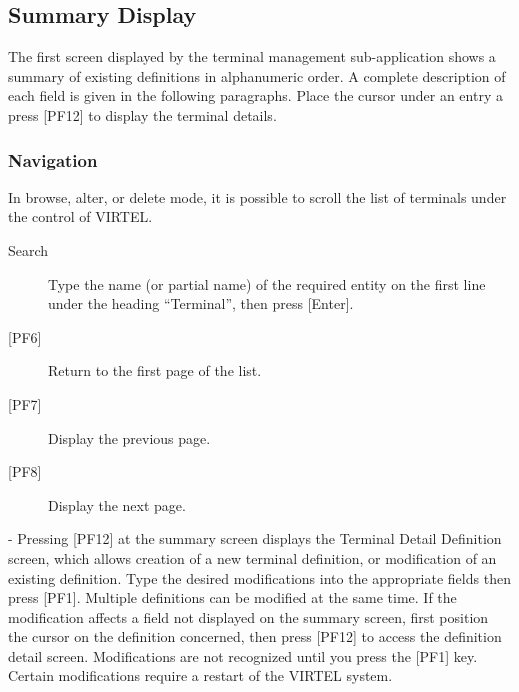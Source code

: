 \documentclass[letterpaper,10pt,english]{sphinxmanual}
\begin{document}

\subsection{Summary Display}
\label{\detokenize{connectivity_guide:index-97}}\label{\detokenize{connectivity_guide:id50}}
The first screen displayed by the terminal management sub-application shows a summary of existing definitions in alphanumeric order. A complete description of each field is given in the following paragraphs. Place the cursor under an entry a press {[}PF12{]} to display the terminal details.



\subsubsection{Navigation}
\label{\detokenize{connectivity_guide:id51}}\label{\detokenize{connectivity_guide:index-98}}
In browse, alter, or delete mode, it is possible to scroll the list of terminals under the control of VIRTEL.
\begin{description}
\item[{Search}] \leavevmode
Type the name (or partial name) of the required entity on the first line under the heading “Terminal”, then press {[}Enter{]}.

\item[{{[}PF6{]}}] \leavevmode
Return to the first page of the list.

\item[{{[}PF7{]}}] \leavevmode
Display the previous page.

\item[{{[}PF8{]}}] \leavevmode
Display the next page.

\end{description}

 - Pressing {[}PF12{]} at the summary screen displays the Terminal Detail Definition screen, which allows creation of a new terminal definition, or modification of an existing definition. Type the desired modifications into the appropriate fields then press {[}PF1{]}. Multiple definitions can be modified at the same time. If the modification affects a field not displayed on the summary screen, first position the cursor on the definition concerned, then press {[}PF12{]} to access the definition detail screen. Modifications are not recognized until you press the {[}PF1{]} key. Certain modifications require a restart of the VIRTEL
system.
\end{document}
